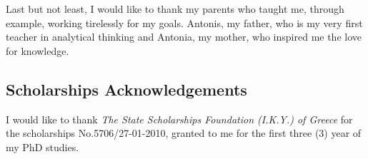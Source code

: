 \documentclass[
    12pt, %
    singlespacing, %
    liststotoc, %
    headsepline, %
]{DoctoralThesis} %
\begin{document}
Last but not least, I would like to thank my parents who taught me, through example, working tirelessly for my goals. Antonis, my father, who is my very first teacher in analytical thinking and Antonia, my mother, who inspired me the love for knowledge. 

\subsection*{Scholarships Acknowledgements}
I would like to thank \textit{The State Scholarships Foundation (I.K.Y.) of Greece} for the scholarships No.5706/27-01-2010, granted to me for the first three (3) year of my PhD studies.


\newpage



\end{document}
